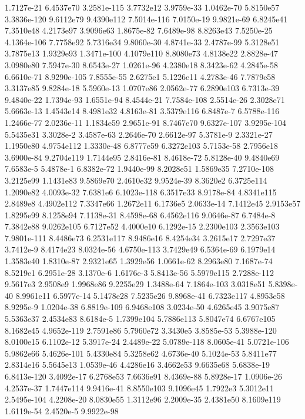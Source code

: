 1.7127e-21 6.4537e70 3.2581e-115 3.7732e12 3.9759e-33 1.0462e-70 5.8150e57 3.3836e-120 9.6112e79 9.4390e112 
7.5014e-116 7.0150e-19 9.9821e-69 6.8245e41 7.3510e48 4.2173e97 3.9096e63 1.8675e-82 7.6489e-98 8.8263e43 
7.5250e-25 4.1364e-106 7.7758e92 5.7316e34 9.8060e-30 4.8741e-33 2.4787e-99 5.3128e51 3.7875e13 1.9329e93 
1.3471e-100 4.1079e110 8.8080e73 4.8138e22 2.8828e-47 3.0980e80 7.5947e-30 8.6543e-27 1.0261e-96 4.2380e18 
8.3423e-62 4.2845e-58 6.6610e-71 8.9290e-105 7.8555e-55 2.6275e1 5.1226e11 4.2783e-46 7.7879e58 3.3137e85 
9.8284e-18 5.5960e-13 1.0707e86 2.0562e-77 6.2890e103 6.7313e-39 9.4840e-22 1.7394e-93 1.6551e-94 8.4544e-21 
7.7584e-108 2.5514e-26 2.3028e71 5.6663e-13 1.4543e14 8.4981e32 4.8163e-81 3.5379e116 6.8487e-7 6.5788e-116 
1.2466e-77 2.0236e-11 1.1834e59 2.9651e-91 8.7467e70 9.6327e-107 3.9295e-104 5.5435e31 3.3028e-2 3.4587e-63 
2.2646e-70 2.6612e-97 5.3781e-9 2.3321e-27 1.1950e80 4.9754e112 1.3330e-48 6.8777e59 6.3272e103 5.7153e-58 
2.7956e18 3.6900e-84 9.2704e119 1.7144e95 2.8416e-81 8.4618e-72 5.8128e-40 9.4840e69 7.6583e-5 5.4878e-1 
6.8382e-72 1.9440e-99 8.2028e51 1.5869e35 7.2710e-108 3.2125e99 1.1431e83 9.5869e70 2.4610e32 9.9524e-39 
8.3620e2 6.3725e114 1.2090e82 4.0093e-32 7.6381e6 6.1023e-118 6.3517e33 8.9178e-84 4.8341e115 2.8489e8 
4.4902e112 7.3347e66 1.2672e11 6.1736e5 2.0633e-14 7.1412e45 2.9153e57 1.8295e99 8.1258e94 7.1138e-31 
8.4598e-68 6.4562e116 9.0646e-87 6.7484e-8 7.3842e88 9.0262e105 6.7127e52 4.4000e10 6.1292e-15 2.2300e103 
2.3563e103 7.9801e-111 8.4486e73 6.2531e117 8.9486e16 8.4254e34 3.2615e17 2.7297e37 3.7412e-9 8.4174e23 
8.0324e-56 4.6750e-113 3.7429e49 6.5364e-69 6.1979e14 1.3583e40 1.8310e-87 2.9321e65 1.3929e56 1.0661e-62 
8.2963e80 7.1687e-74 8.5219e1 6.2951e-28 3.1370e-6 1.6176e-3 5.8413e-56 5.5979e115 2.7288e-112 9.5617e3 
2.9508e9 1.9968e86 9.2255e29 1.3488e-64 7.1864e-103 3.0318e51 5.8398e-40 8.9961e11 6.5977e-14 5.1478e28 
7.5235e26 9.8968e-41 6.7323e117 4.8953e58 8.9295e-9 1.0204e-38 6.8819e-109 6.9468e108 3.0234e-50 4.6265e45 
3.9075e87 5.5363e37 2.4534e83 8.6184e-5 1.7399e104 5.7886e113 5.8047e74 6.6767e105 8.1682e45 4.9652e-119 
2.7591e86 5.7960e72 3.3430e5 3.8585e-53 5.3988e-120 8.0100e15 6.1102e-12 5.3917e-24 2.4489e-22 5.0789e-118 
8.0605e-41 5.0721e-106 5.9862e66 5.4626e-101 5.4330e84 5.3258e62 4.6736e-40 5.1024e-53 5.8411e77 2.8314e16 
5.5645e13 1.0539e-46 4.4286e16 3.4662e53 9.6635e68 5.6838e-19 6.8413e-120 3.4092e-17 6.2768e53 7.6636e91 
8.4369e-88 5.8928e-17 1.0906e-26 4.2537e-37 1.7447e114 9.9416e-41 8.8550e103 9.1096e45 1.7922e3 5.3012e11 
2.5495e-104 4.2208e-20 8.0830e55 1.3112e96 2.2009e-35 2.4381e50 8.1609e119 1.6119e-54 2.4520e-5 9.9922e-98
